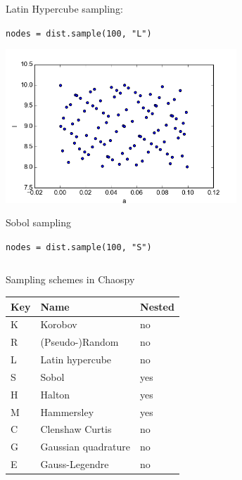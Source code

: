 \documentclass{beamer}
\begin{document}
\begin{frame}[fragile]
\begin{columns}
\begin{center}
                Latin Hypercube sampling:

                \scriptsize
                \verb;nodes = dist.sample(100, "L");
                \normalsize



                \includegraphics[width=0.65\textwidth]{samples_S.png}

                Sobol sampling

                \scriptsize
                \verb;nodes = dist.sample(100, "S");
                \normalsize
     \end{center}
 \end{columns}
\end{frame}

\begin{frame}{Sampling schemes in Chaospy}
\begin{center}

 \begin{tabular}{lll}
     Key &    Name              &  Nested\\\hline
    K &    Korobov            & no\\
    R &    (Pseudo-)Random    & no\\
    L &    Latin hypercube    & no\\
    S &    Sobol              & yes\\
    H &    Halton             & yes\\
    M&     Hammersley         & yes \\\hline
  C &    Clenshaw Curtis    & no\\
    G &    Gaussian quadrature& no\\
    E & Gauss-Legendre & no\\\hline
 \end{tabular}

\end{center}

\end{frame}
\end{document}
